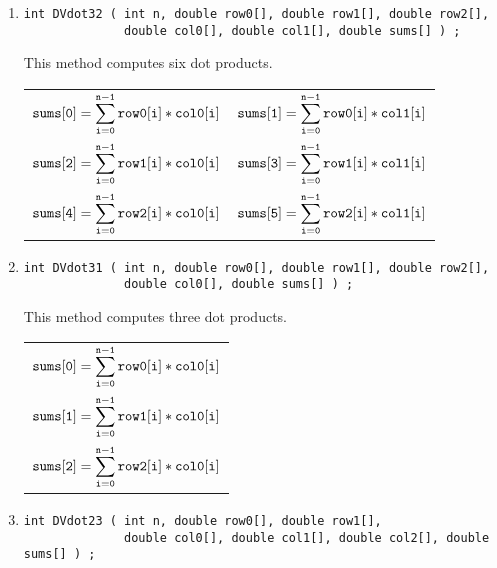 \begin{enumerate}
\begin{tabular}{lll}
\end{tabular}
\item
\begin{verbatim}
int DVdot32 ( int n, double row0[], double row1[], double row2[], 
              double col0[], double col1[], double sums[] ) ;
\end{verbatim}
This method computes six dot products.
\par
\begin{tabular}{ll}
$\displaystyle{\tt sums[0]}
               = \sum_{\tt i = 0}^{\tt n-1} {\tt row0[i] * col0[i]}$ &
$\displaystyle{\tt sums[1]}
               = \sum_{\tt i = 0}^{\tt n-1} {\tt row0[i] * col1[i]}$ \\
$\displaystyle{\tt sums[2]}
               = \sum_{\tt i = 0}^{\tt n-1} {\tt row1[i] * col0[i]}$ &
$\displaystyle{\tt sums[3]}
               = \sum_{\tt i = 0}^{\tt n-1} {\tt row1[i] * col1[i]}$ \\
$\displaystyle{\tt sums[4]}
               = \sum_{\tt i = 0}^{\tt n-1} {\tt row2[i] * col0[i]}$ &
$\displaystyle{\tt sums[5]}
               = \sum_{\tt i = 0}^{\tt n-1} {\tt row2[i] * col1[i]}$
\end{tabular}
\item
\begin{verbatim}
int DVdot31 ( int n, double row0[], double row1[], double row2[], 
              double col0[], double sums[] ) ;
\end{verbatim}
This method computes three dot products.
\par
\begin{tabular}{l}
$\displaystyle{\tt sums[0]}
               = \sum_{\tt i = 0}^{\tt n-1} {\tt row0[i] * col0[i]}$ \\
$\displaystyle{\tt sums[1]}
               = \sum_{\tt i = 0}^{\tt n-1} {\tt row1[i] * col0[i]}$ \\
$\displaystyle{\tt sums[2]}
               = \sum_{\tt i = 0}^{\tt n-1} {\tt row2[i] * col0[i]}$ 
\end{tabular}
\item
\begin{verbatim}
int DVdot23 ( int n, double row0[], double row1[],         
              double col0[], double col1[], double col2[], double sums[] ) ;
\end{verbatim}

\end{enumerate}
